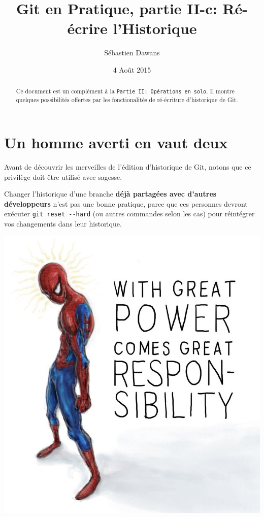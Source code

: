 \documentclass{../../common/tufte-latex/tufte-handout}
\title{Git en Pratique, partie II-c: R\'e-\'ecrire l'Historique}
\author{S\'ebastien Dawans}
\date{4 Ao\^ut 2015} %
\begin{document}
\maketitle%

\begin{abstract}
\noindent
Ce document est un complément à la \texttt{Partie II: Op\'erations en solo}.
Il montre quelques possibilités offertes par les fonctionalités de ré-écriture d'historique de Git.
\end{abstract}

\section{Un homme averti en vaut deux}

Avant de découvrir les merveilles de l'édition d'historique de Git, notons que ce privilège doit être utilisé avec sagesse.

Changer l'historique d'une branche \textbf{déjà partagées avec d'autres développeurs} n'est pas une bonne pratique, parce que ces personnes devront exécuter \texttt{git reset -{}-hard} (ou autres commandes selon les cas) pour réintégrer vos changements dans leur historique.

\begin{marginfigure}%
  \centering
  \includegraphics[width=\linewidth]{spiderman.jpg}
  \label{fig:spiderman}
\end{marginfigure}
\end{document}
